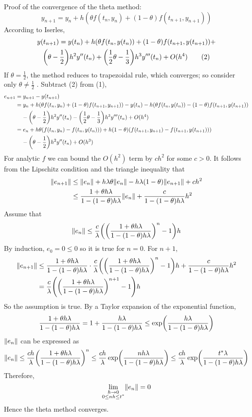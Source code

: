 \documentclass[10pt]{report}
\DeclarePairedDelimiter\autoparen{(}{)}
\newcommand{\pa}[1]{\autoparen*{#1}}
\DeclarePairedDelimiter\autodvert{\Vert}{\Vert}
\newcommand{\norm}[1]{\autodvert*{#1}}
\begin{document}
\begin{enumerate}
	Proof of the convergence of the theta method:
	\[
	y_{n+1} = y_n + h(\theta f(t_n,y_n) + (1-\theta)f(t_{n+1}, y_{n+1})) \tag{1}
	\]
	According to Iserles, 
	\begin{multline}
	y(t_{n+1}) = y(t_n) + h(\theta f(t_n,y(t_n)) + (1-\theta)f(t_{n+1}, y(t_{n+1})) +\\
	\pa{\theta - \frac{1}{2}}h^2y''(t_n) + \pa{\frac{1}{2}\theta - \frac{1}{3}}h^3y'''(t_n) + O(h^4) \tag{2}
	\end{multline}
	If $\theta = \frac{1}{2}$, the method reduces to trapezoidal rule, which converges; so consider only $\theta\ne\frac{1}{2}$ . Subtract (2) from (1), 
	\begin{align*}
		e_{n+1}
		&= y_{n+1} - y(t_{n+1})\\
		&= y_n + h(\theta f(t_n,y_n) + (1-\theta)f(t_{n+1}, y_{n+1})) - y(t_n) - h(\theta f(t_n,y(t_n)) - (1-\theta)f(t_{n+1}, y(t_{n+1}))\\
		&\phantom{=\ } - \pa{\theta - \frac{1}{2}}h^2y''(t_n) - \pa{\frac{1}{2}\theta - \frac{1}{3}}h^3y'''(t_n) + O(h^4)\\
		&= e_n + h\theta \pa{f(t_n,y_n) - f(t_n,y(t_n))} + h(1-\theta)\pa{f(t_{n+1},y_{n+1}) - f(t_{n+1},y(t_{n+1}))}\\
		&\phantom{=\ } - \pa{\theta - \frac{1}{2}}h^2y''(t_n) + O(h^3)
	\end{align*}
	For analytic $f$ we can bound the $O(h^2)$ term by $ch^2$ for some $c > 0$. It follows from the Lipschitz condition and the triangle inequality that
	\begin{align*}
	\norm{e_{n+1}} 
	&\le \norm{e_n} + h\lambda\theta\norm{e_n} - h\lambda(1-\theta)\norm{e_{n+1}} + ch^2\\
	&\le \frac{1+\theta h\lambda}{1-(1-\theta)h\lambda} \norm{e_n} + \frac{c}{1-(1-\theta)h\lambda}h^2
	\end{align*}
	Assume that
	\[
	\norm{e_n} \le \frac{c}{\lambda} \pa{\pa{\frac{1+\theta h\lambda}{1-(1-\theta)h\lambda}}^n - 1}h
	\]
	By induction, $e_0 = 0 \le 0$ so it is true for $n=0$. For $n+1$,
	\begin{align*}
	\norm{e_{n+1}} 
	&\le \frac{1+\theta h\lambda}{1-(1-\theta)h\lambda}\cdot \frac{c}{\lambda} \pa{\pa{\frac{1+\theta h\lambda}{1-(1-\theta)h\lambda}}^n - 1}h + \frac{c}{1-(1-\theta)h\lambda}h^2\\
	&= \frac{c}{\lambda} \pa{\pa{\frac{1+\theta h\lambda}{1-(1-\theta)h\lambda}}^{n+1} - 1}h
	\end{align*}
	So the assumption is true. By a Taylor expansion of the exponential function,
	\[
	\frac{1+\theta h\lambda}{1-(1-\theta)h\lambda}
	= 1+\frac{h\lambda}{1-(1-\theta)h\lambda}
	\le \exp\pa{\frac{h\lambda}{1-(1-\theta)h\lambda}}
	\]
	$\norm{e_n}$ can be expressed as 
	\[
	\norm{e_n} 
	\le \frac{ch}{\lambda} \pa{\frac{1+\theta h\lambda}{1-(1-\theta)h\lambda}}^n
	\le \frac{ch}{\lambda} \exp\pa{\frac{nh\lambda}{1-(1-\theta)h\lambda}}
	\le \frac{ch}{\lambda} \exp\pa{\frac{t^*\lambda}{1-(1-\theta)h\lambda}}
	\]
	Therefore,
	\[
	\lim\limits_{\substack{h\to 0\\0\le nh\le t^*}} \norm{e_n} = 0
	\]
	Hence the theta method converges.
	

\end{enumerate}
\end{document}
